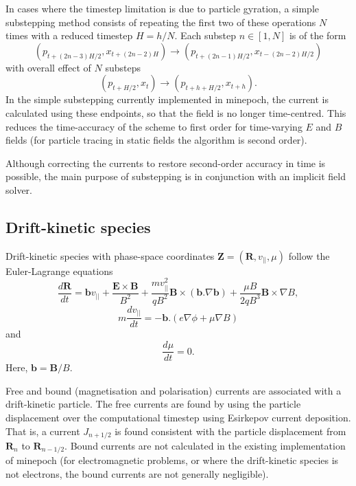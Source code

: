 \documentclass{article}
\begin{document}
In cases where the timestep limitation is due to particle gyration, a simple substepping method consists of repeating the first two of these operations $N$ times with a reduced timestep $H=h/N$. Each substep $n \in [1,N]$ is of the form
\begin{equation}
   (p_{t + (2 n - 3) H/2},x_{ t + (2 n -2 ) H} ) \rightarrow (p_{t + (2 n - 1) H/2},x_{t- (2 n -2 )H/2})
\end{equation}
with overall effect of $N$ substeps 
  \begin{equation}
   (p_{t +  H/2},x_{ t} ) \rightarrow (p_{t + h + H/2},x_{t + h}).
\end{equation} 
  In the simple substepping currently implemented in minepoch, the current is calculated using these endpoints, so that the field is no longer time-centred. This reduces the time-accuracy of the scheme to first order for time-varying $E$ and $B$ fields (for particle tracing in static fields the algorithm is second order).

Although correcting the currents to restore  second-order accuracy in time is possible, the main purpose of substepping is in conjunction with an implicit field solver. 
  
\subsection{Drift-kinetic species}

Drift-kinetic species with phase-space coordinates $\mathbf{Z}=(\mathbf{R},v_{||},\mu)$ follow the Euler-Lagrange equations
\begin{equation}
  \frac{d \mathbf{R}}{dt} = \mathbf{b} v_{||}
  + \frac{\mathbf{E} \times \mathbf{B}}{B^2}
  + \frac{m v_{||}^2}{q B^2} \mathbf{B} \times \left( \mathbf{b} . \nabla \mathbf{b} \right)
  + \frac{\mu B}{2 q B^3} \mathbf{B} \times \nabla B,
\end{equation}
\begin{equation}
  m \frac{d v_{||}}{dt} = - \mathbf{b} . ( e \nabla \phi + \mu \nabla B )  
\end{equation}
and
\begin{equation}
  \frac{d \mu}{dt} = 0.
\end{equation}
Here, $\mathbf{b} = \mathbf{B}/B$.

Free and bound (magnetisation and polarisation) currents are associated with a drift-kinetic particle. The free currents are found by using the particle displacement over the computational timestep using Esirkepov current deposition. That is, a current $J_{n+1/2}$ is found consistent with the particle displacement from $\mathbf{R}_n$ to $\mathbf{R}_{n-1/2}$. Bound currents are not calculated in the existing implementation of minepoch (for electromagnetic problems, or where the drift-kinetic species is not electrons, the bound currents are not generally negligible).
\end{document}
